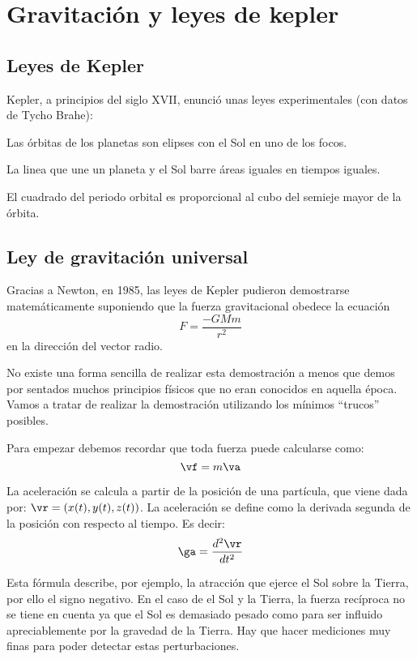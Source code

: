 
\chapter{Gravitación y leyes de kepler}
\section{Leyes de Kepler}

Kepler, a principios del siglo XVII, enunció unas leyes experimentales (con datos de Tycho Brahe):

\begin{lemma}
	Las órbitas de los planetas son elipses con el Sol en uno de los focos.
\end{lemma}

\begin{lemma}
	La linea que une un planeta y el Sol barre áreas iguales en tiempos iguales.
\end{lemma}

\begin{lemma}
	El cuadrado del periodo orbital es proporcional al cubo del semieje mayor de la órbita.
\end{lemma}

\section{Ley de gravitación universal}

Gracias a Newton, en 1985, las leyes de Kepler pudieron demostrarse matemáticamente suponiendo que la fuerza gravitacional obedece la ecuación
\[ F = \frac{-GMm}{r^2} \]
en la dirección del vector radio.

No existe una forma sencilla de realizar esta demostración a menos que demos por sentados muchos principios físicos que no eran conocidos en aquella época. Vamos a tratar de realizar la demostración utilizando los mínimos ``trucos'' posibles.

Para empezar debemos recordar que toda fuerza puede calcularse como:
$$ \vf = m\va$$

La aceleración se calcula a partir de la posición de una partícula, que viene dada por: $\vr = (x(t), y(t), z(t))$. La aceleración se define como la derivada segunda de la posición con respecto al tiempo. Es decir:
\[ \ga = \frac{d^2\vr}{d t^2} \]

Esta fórmula describe, por ejemplo, la atracción que ejerce el Sol sobre la Tierra, por ello el signo negativo. En el caso de el Sol y la Tierra, la fuerza recíproca no se tiene en cuenta ya que el Sol es demasiado pesado como para ser influido apreciablemente por la gravedad de la Tierra. Hay que hacer mediciones muy finas para poder detectar estas perturbaciones.

